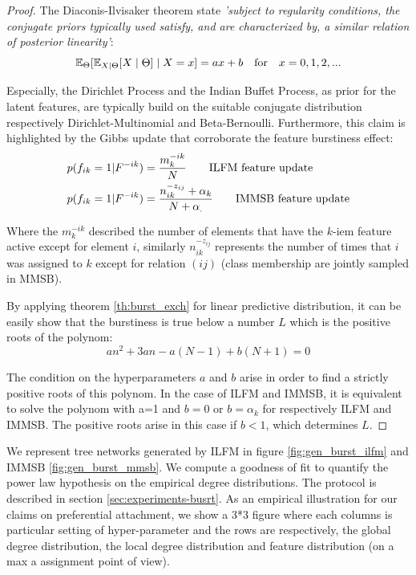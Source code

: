 \begin{proof}
The Diaconis-Ilvisaker theorem \cite{diaconis1979conjugate} state \emph{'subject to regularity conditions, the conjugate priors typically used satisfy, and are characterized by, a  similar relation of posterior linearity'}:
\begin{equation}
\mathbb{E}_\Theta[\mathbb{E}_{X|\Theta}[X\mid \Theta] \mid X=x] = ax+b \quad \textnormal{for} \quad x=0,1,2,... \nonumber
\end{equation}

Especially, the Dirichlet Process and the Indian Buffet Process, as prior for the latent features, are typically build on the suitable conjugate distribution respectively Dirichlet-Multinomial and Beta-Bernoulli. Furthermore, this claim is highlighted by the Gibbs update that corroborate the feature burstiness effect:
\begin{align} \label{eq:feat_up}
&\p(f_{ik} = 1 | F^{-ik}) = \frac{m_k^{-ik}}{N} \qquad \text{ILFM feature update} \nonumber \\
&\p(f_{ik} = 1 | F^{-ik}) = \frac{n_{ik}^{-z_{ij}}+\alpha_k}{N+\alpha_.} \qquad \text{IMMSB feature update} \nonumber \\
\end{align}

Where the $m_k^{-ik}$ described the number of elements that have the $k$-iem feature active except for element $i$, similarly $n_{ik}^{-z_{ij}}$ represents the number of times that $i$ was assigned to $k$ except for relation $(ij)$ (class membership are jointly sampled in MMSB).

By applying theorem \ref{th:burst_exch} for linear predictive distribution, it can be easily show that the burstiness is true below a number $L$ which is the positive roots of the polynom:
\begin{equation}
	 an^2 + 3an - a(N-1) + b(N+1) = 0
\end{equation}

The condition on the hyperparameters $a$ and $b$ arise in order to find a strictly positive roots of this polynom. In the case of ILFM and IMMSB, it is equivalent to solve the polynom with a=1 and  $b=0$ or $b=\alpha_k$ for respectively ILFM and IMMSB. The positive roots arise in this case if $b < 1$, which determines $L$.
\end{proof}

We represent tree networks generated by ILFM in figure \ref{fig:gen_burst_ilfm} and IMMSB \ref{fig:gen_burst_mmsb}. We compute a goodness of fit to quantify the power law hypothesis on the empirical degree distributions. The protocol is described in section \ref{sec:experiments-busrt}. As an empirical illustration for our claims on preferential attachment, we show a 3*3 figure where each columns is particular setting of hyper-parameter and the rows are respectively, the global degree distribution, the local degree distribution and feature distribution (on a max a assignment point of view).

